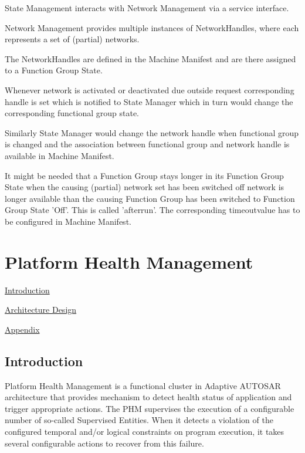 \begin{DoxyItemize}
\item State Management interacts with Network Management via a service interface.
\item Network Management provides multiple instances of Network\+Handles, where each represents a set of (partial) networks.
\item The Network\+Handles are defined in the Machine Manifest and are there assigned to a Function Group State.
\item Whenever network is activated or deactivated due outside request corresponding handle is set which is notified to State Manager which in turn would change the corresponding functional group state.
\item Similarly State Manager would change the network handle when functional group is changed and the association between functional group and network handle is available in Machine Manifest.
\item It might be needed that a Function Group stays longer in its Function Group State when the causing (partial) network set has been switched off network is longer available than the causing Function Group has been switched to Function Group State ’\+Off’. This is called ’afterrun’. The corresponding timeoutvalue has to be configured in Machine Manifest. 
\end{DoxyItemize}\hypertarget{Guideline_Document_for_Platform_Health_Management}{}\section{Platform Health Management}\label{Guideline_Document_for_Platform_Health_Management}

\begin{DoxyItemize}
\item \hyperlink{Introduction}{Introduction}
\item \hyperlink{Architecture_Design}{Architecture Design}
\item \hyperlink{Appendix}{Appendix} 
\end{DoxyItemize}\hypertarget{Introduction}{}\subsection{Introduction}\label{Introduction}
Platform Health Management is a functional cluster in Adaptive A\+U\+T\+O\+S\+AR architecture that provides mechanism to detect health status of application and trigger appropriate actions. The P\+HM supervises the execution of a configurable number of so-\/called Supervised Entities. When it detects a violation of the configured temporal and/or logical constraints on program execution, it takes several configurable actions to recover from this failure.

